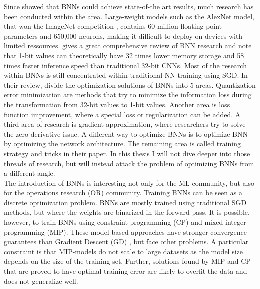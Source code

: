 \noindent Since \cite{Hubara2016} showed that BNNs could achieve state-of-the art results, much research has been conducted within the area. Large-weight models such as the AlexNet model, that won the ImageNet competition \citep{imagenet2012}, contains 60 million floating-point parameters and 650,000 neurons, making it difficult to deploy on devices with limited ressources. \cite{yuan2023} gives a great comprehensive review of BNN research and note that 1-bit values can theoretically have 32 times lower memory storage and 58 times faster inference speed than traditional 32-bit CNNs. Most of the research within BNNs is still concentrated within traditional NN training using SGD. In their review, \cite{yuan2023} divide the optimization solutions of BNNs into 5 areas. Quantization error minimization are methods that try to minimize the information loss during the transformation from 32-bit values to 1-bit values. Another area is loss function improvement, where a special loss or regularization can be added. A third area of research is gradient approximation, where researchers try to solve the zero derivative issue. A different way to optimize BNNs is to optimize BNN by optimizing the network architecture. The remaining area is called training strategy and tricks in their paper. In this thesis I will not dive deeper into those threads of research, but will instead attack the problem of optimizing BNNs from a different angle.\\

\noindent The introduction of BNNs is interesting not only for the ML community, but also for the operations research (OR) community. Training BNNs can be seen as a discrete optimization problem. BNNs are mostly trained using traditional SGD methods, but where the weights are binarized in the forward pass. It is possible, however, to train BNNs using constraint programming (CP) and mixed-integer programming (MIP). These model-based approaches have stronger convergence guarantees than Gradient Descent (GD) \citep{icarte2019}, but face other problems. A particular constraint is that MIP-models do not scale to large datasets as the model size depends on the size of the training set. Further, solutions found by MIP and CP that are proved to have optimal training error are likely to overfit the data and does not generalize well. \\

